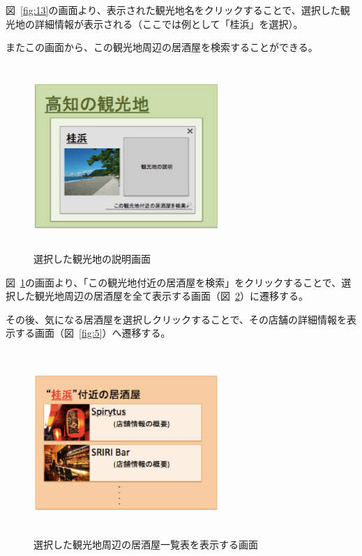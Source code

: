 \documentclass[a4j,titlepage]{jarticle}
\begin{document}
図~\ref{fig:13}の画面より、表示された観光地名をクリックすることで、選択した観光地の詳細情報が表示される（ここでは例として「桂浜」を選択）。



またこの画面から、この観光地周辺の居酒屋を検索することができる。






\begin {figure}[!htbp]
    \begin{center}
    \includegraphics [height=7cm, width=7cm]{14.eps}
    \caption {選択した観光地の説明画面}
    \label {fig:14}
    \end{center}
\end {figure}



図~\ref{fig:14}の画面より、「この観光地付近の居酒屋を検索」をクリックすることで、選択した観光地周辺の居酒屋を全て表示する画面（図~\ref{fig:15}）に遷移する。



その後、気になる居酒屋を選択しクリックすることで、その店舗の詳細情報を表示する画面（図~\ref{fig:5}）へ遷移する。
\clearpage
\begin {figure}[!htbp]
    \begin{center}
    \includegraphics [height=7cm, width=7cm]{15.eps}
    \caption {選択した観光地周辺の居酒屋一覧表を表示する画面}
    \label {fig:15}
    \end{center}
\end {figure}
\end{document}
